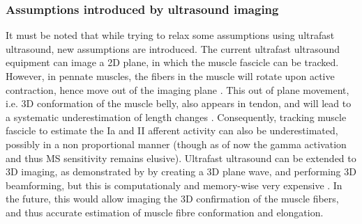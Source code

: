 \subsubsection{Assumptions introduced by ultrasound imaging}
It must be noted that while trying to relax some assumptions using ultrafast ultrasound, new assumptions are introduced. The current ultrafast ultrasound equipment can image a 2D plane, in which the muscle fascicle can be tracked. However, in pennate muscles, the fibers in the muscle will rotate upon active contraction, hence move out of the imaging plane \cite{finni_structural_2006}. This out of plane movement, i.e. 3D conformation of the muscle belly, also appears in tendon, and will lead to a systematic underestimation of length changes \cite{seynnes_ultrasound-based_2014}. Consequently, tracking muscle fascicle to estimate the Ia and II afferent activity can also be underestimated, possibly in a non proportional manner (though as of now the gamma activation and thus MS sensitivity remains elusive). Ultrafast ultrasound can be extended to 3D imaging, as demonstrated by \citeauthor{provost_3d_2014} by creating a 3D plane wave, and performing 3D beamforming, but this is computationaly and memory-wise very expensive \cite{provost_3d_2014}. In the future, this would allow imaging the 3D confirmation of the muscle fibers, and thus accurate estimation of muscle fibre conformation and elongation. 





